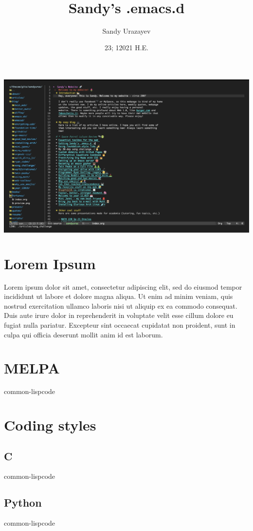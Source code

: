 \documentclass[11pt]{article}
\author{Sandy Urazayev}
\date{23; 12021 H.E.}
\title{Sandy's .emacs.d}
\begin{document}
\maketitle
\tableofcontents

\begin{center}
\includegraphics[width=.9\linewidth]{./emacs.png}
\end{center}

\section{Lorem Ipsum}
\label{sec:orgf8d3cf8}
Lorem ipsum dolor sit amet, consectetur adipiscing elit, sed do eiusmod tempor
incididunt ut labore et dolore magna aliqua. Ut enim ad minim veniam, quis
nostrud exercitation ullamco laboris nisi ut aliquip ex ea commodo
consequat. Duis aute irure dolor in reprehenderit in voluptate velit esse cillum
dolore eu fugiat nulla pariatur. Excepteur sint occaecat cupidatat non proident,
sunt in culpa qui officia deserunt mollit anim id est laborum. 

\section{MELPA}
\label{sec:org6f3b0f9}
common-lispcode
\section{Coding styles}
\label{sec:org7cf472e}
\subsection{C}
\label{sec:orgb8e618e}

common-lispcode
\subsection{Python}
\label{sec:org15946a3}
common-lispcode
\end{document}
